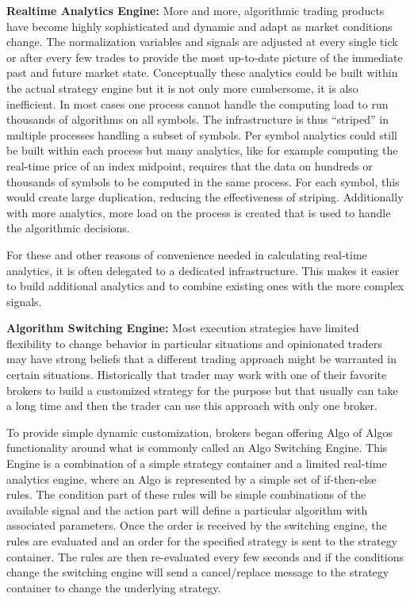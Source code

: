 \noindent\textbf{Realtime Analytics Engine:} More and more, algorithmic trading products have become highly sophisticated and dynamic and adapt as market conditions change. The normalization variables and signals are adjusted at every single tick or after every few trades to provide the most up-to-date picture of the immediate past and future market state. Conceptually these analytics could be built within the actual strategy engine but it is not only more cumbersome, it is also inefficient. In most cases one process cannot handle the computing load to run thousands of algorithms on all symbols. The infrastructure is thus ``striped'' in multiple processes handling a subset of symbols. Per symbol analytics could still be built within each process but many analytics, like for example computing the real-time price of an index midpoint, requires that the data on hundreds or thousands of symbols to be computed in the same process. For each symbol, this would create large duplication, reducing the effectiveness of striping. Additionally with more analytics, more load on the process is created that is used to handle the algorithmic decisions.


For these and other reasons of convenience needed in calculating real-time analytics, it is often delegated to a dedicated infrastructure. This makes it easier to build additional analytics and to combine existing ones with the more complex signals. \twomedskip


\noindent\textbf{Algorithm Switching Engine:}\label{in:algo_swit_eng} Most execution strategies have limited flexibility to change behavior in particular situations and opinionated traders may have strong beliefs that a different trading approach might be warranted in certain situations. Historically that trader may work with one of their favorite brokers to build a customized strategy for the purpose but that usually can take a long time and then the trader can use this approach with only one broker. 


To provide simple dynamic customization, brokers began offering Algo of Algos functionality around what is commonly called an Algo Switching Engine. This Engine is a combination of a simple strategy container and a limited real-time analytics engine, where an Algo is represented by a simple set of if-then-else rules. The condition part of these rules will be simple combinations of the available signal and the action part will define a particular algorithm with associated parameters. Once the order is received by the switching engine, the rules are evaluated and an order for the specified strategy is sent to the strategy container. The rules are then re-evaluated every few seconds and if the conditions change the switching engine will send a cancel/replace message to the strategy container to change the underlying strategy. \twomedskip


